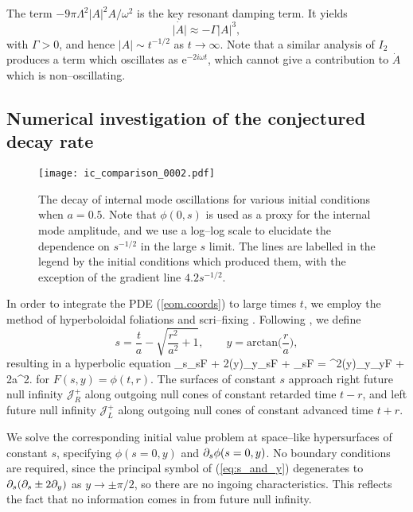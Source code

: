 The term $-9\pi\Lambda^2|A|^2A/\omega^2$ is the key resonant damping term. It yields
\[
\dot{|A|}\approx-\Gamma|A|^3,
\]
with $\Gamma>0$, and hence $|A|\sim t^{-1/2}$ as $t\rightarrow \infty$. Note that a similar analysis of $I_2$ produces a term which oscillates as $\mathrm{e}^{-2i\omega t}$, which cannot give a contribution to $\dot{A}$ which is non--oscillating.

\subsection{Numerical investigation of the conjectured decay rate}
\label{sec:numerics}

\begin{figure}
\texttt{[image: ic\_comparison\_0002.pdf]}
\caption{\label{fig:decay} The decay of internal mode oscillations for various initial conditions when $a=0.5$. Note that $\phi(0,s)$ is used as a proxy for the internal mode amplitude, and we use a log--log scale to elucidate the dependence on $s^{-1/2}$ in the large $s$ limit. The lines are labelled in the legend by the initial conditions which produced them, with the exception of the gradient line $4.2s^{-1/2}$.}
\end{figure}

In order to integrate the PDE (\ref{eom.coords}) to large times $t$, we employ the method of hyperboloidal foliations and scri--fixing \cite{hyp_foliations}. Following \cite{wavemaps, SG}, we define
\[
s = \frac{t}{a} - \sqrt{\frac{r^2}{a^2}+1}, \qquad y=\mathrm{arctan}\Big(\frac{r}{a}\Big),
\]
resulting in a hyperbolic equation
\be
\label{eq:s_and_y}
\p_s\p_sF + 2(y)\p_y\p_sF + \p_sF = ^2(y)\p_y\p_yF + 2a^2.
\ee
for $F(s,y)=\phi(t,r)$. The surfaces of constant $s$ approach right future null infinity $\mathcal{J}^+_R$ along outgoing null cones of constant retarded time $t-r$, and left future null infinity $\mathcal{J}^+_L$ along outgoing null cones of constant advanced time $t+r$.

We solve the corresponding initial value problem at space--like hypersurfaces of constant $s$, specifying $\phi(s=0,y)$ and $\partial_s\phi(s=0,y)$. No boundary conditions are required, since the principal symbol of (\ref{eq:s_and_y}) degenerates to $\partial_s(\partial_s\pm 2\partial_y)$ as $y\rightarrow\pm \pi/2$, so there are no ingoing characteristics. This reflects the fact that no information comes in from future null infinity.

